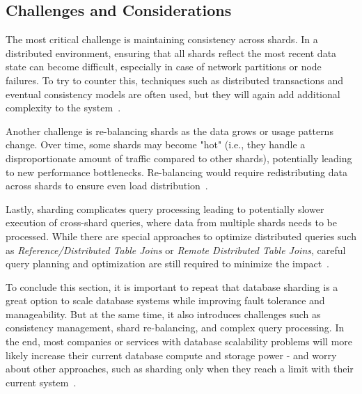 \subsection{Challenges and Considerations}
The most critical challenge is maintaining consistency across shards. In a distributed environment, ensuring that all shards reflect the most recent data state can become difficult, especially in case of network partitions or node failures. To try to counter this, techniques such as distributed transactions and eventual consistency models are often used, but they will again add additional complexity to the system~\parencite{skyline_joins}.

Another challenge is re-balancing shards as the data grows or usage patterns change. Over time, some shards may become "hot" (i.e., they handle a disproportionate amount of traffic compared to other shards), potentially leading to new performance bottlenecks. Re-balancing would require redistributing data across shards to ensure even load distribution~\parencite{db_sharding_cloud}.

Lastly, sharding complicates query processing leading to potentially slower execution of cross-shard queries, where data from multiple shards needs to be processed. While there are special approaches to optimize distributed queries such as \textit{Reference/Distributed Table Joins} or \textit{Remote Distributed Table Joins}, careful query planning and optimization are still required to minimize the impact~\parencite{db_sharding_joins}.

To conclude this section, it is important to repeat that database sharding is a great option to scale database systems while improving fault tolerance and manageability. But at the same time, it also introduces challenges such as consistency management, shard re-balancing, and complex query processing. In the end, most companies or services with database scalability problems will more likely increase their current database compute and storage power - and worry about other approaches, such as sharding only when they reach a limit with their current system~\parencite{db_sharding_newsql}.  